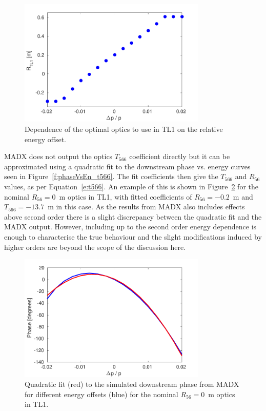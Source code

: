\begin{figure}
  \centering
  \includegraphics[width=0.8\textwidth]{Figures/propagation/optR56vsEnergy}
  \caption{Dependence of the optimal optics to use in TL1 on the relative energy offset.}
  \label{f:optR56vsEnergy}
\end{figure}

MADX does not output the optics \(T_{566}\) coefficient directly but it can be approximated using a quadratic fit to the downstream phase vs. energy curves seen in Figure~\ref{f:phaseVsEn_t566}. The fit coefficients then give the \(T_{566}\) and \(R_{56}\) values, as per Equation~\ref{e:t566}. An example of this is shown in Figure~\ref{f:madxT566Fit} for the nominal \(R_{56}=0\)~m optics in TL1, with fitted coefficients of \(R_{56}=-0.2\)~m and \(T_{566}=-13.7\)~m in this case. As the results from MADX also includes effects above second order there is a slight discrepancy between the quadratic fit and the MADX output. However, including up to the second order energy dependence is enough to characterise the true behaviour and the slight modifications induced by higher orders are beyond the scope of the discussion here.

\begin{figure}
  \centering
  \includegraphics[width=0.8\textwidth]{Figures/propagation/madxT566Fit}
  \caption{Quadratic fit (red) to the simulated downstream phase from MADX for different energy offsets (blue) for the nominal \(R_{56}=0\)~m optics in TL1.}
  \label{f:madxT566Fit}
\end{figure}

